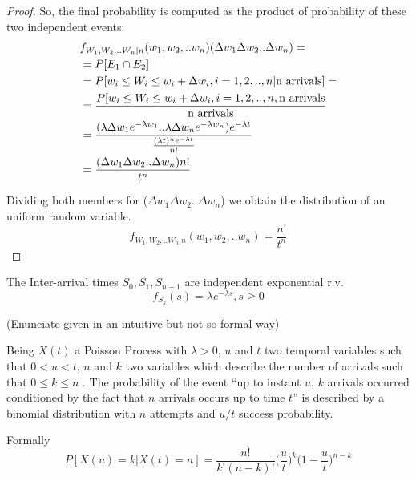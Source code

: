 \begin{theorem}
\begin{proof}
		So, the final probability is computed as the product of probability of these two independent events:
		\begin{equation}
			\begin{split}
				& f_{W_1,W_2,..W_n|n} (w_1,w_2,..w_n)( \Delta w_1\Delta w_2..\Delta w_n) = \\
				& =P[E_1 \cap E_2 ]\\
				& =P[w_i\leq W_i \leq w_i+\Delta w_i, i=1,2,..,n| \textnormal{n arrivals}]=\\
				& =\frac{P[w_i\leq W_i \leq w_i+\Delta w_i, i=1,2,..,n,\textnormal{n arrivals}}{\textnormal{n arrivals}}\\
				& =\frac{(\lambda \Delta w_1 e^{-\lambda w_1}..\lambda \Delta w_n e^{-\lambda w_n})e^{-\lambda t}}{\frac{(\lambda t)^{n}e^{-\lambda t}} {n!}}\\
				& =\frac{ (\Delta w_1 \Delta w_2.. \Delta w_n) n!}{t^n}
			\end{split}
		\end{equation}

		Dividing both members for ($\Delta w_1 \Delta w_2 .. \Delta w_n$) we obtain the distribution of an uniform random variable.
		\begin{equation}
			f_{W_1,W_2,..W_n|n} (w_1,w_2,..w_n) =\frac{n!}{t^n}
		\end{equation}
	\end{proof}
\end{theorem}

\begin{theorem}
	The Inter-arrival times $S_0,S_1, S_{n-1}$ are independent exponential r.v.
	\begin{equation}
		f_{S_k}(s)=\lambda e^{-\lambda s}, s \ge 0
	\end{equation}
\end{theorem}

\begin{theorem}
	(Enunciate given in an intuitive but not so formal way)

	Being $X(t)$ a Poisson Process with $\lambda>0$, $u$ and $t$ two temporal variables such that $0<u<t$, $n$ and $k$ two variables which describe the number of arrivals such that $0\leq k\leq n$ . The probability of the event ``up to instant $u$, $k$ arrivals occurred conditioned by the fact that $n$ arrivals occurs up to time $t$'' is described by a binomial distribution with $n$ attempts and $u/t$ success probability.

	Formally
	\begin{equation}
		P[X(u)=k|X(t)=n]= \frac{n!}{k!(n-k)!}\bigg(\frac{u}{t}\bigg)^k\bigg(1-\frac{u}{t}\bigg)^{n-k}
	\end{equation}
\end{theorem}

